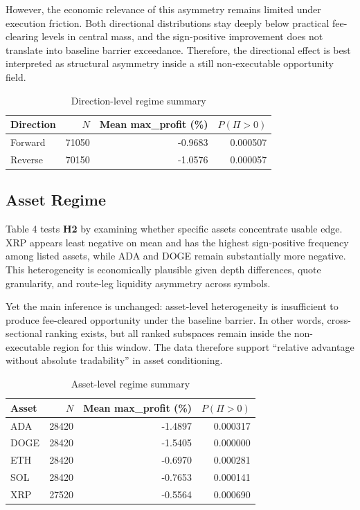 \documentclass[11pt,a4paper]{article}
\begin{document}
\noindent However, the economic relevance of this asymmetry remains limited under execution friction. Both directional distributions stay deeply below practical fee-clearing levels in central mass, and the sign-positive improvement does not translate into baseline barrier exceedance. Therefore, the directional effect is best interpreted as structural asymmetry inside a still non-executable opportunity field.

\begin{table}[H]
\centering
\caption{Direction-level regime summary}
\begin{tabular}{l r r r}
\toprule
Direction & $N$ & Mean max\_profit (\%) & $P(\Pi>0)$ \\
\midrule
Forward & 71050 & -0.9683 & 0.000507 \\
Reverse & 70150 & -1.0576 & 0.000057 \\
\bottomrule
\end{tabular}
\end{table}

\subsection{Asset Regime}
\noindent Table 4 tests \textbf{H2} by examining whether specific assets concentrate usable edge. XRP appears least negative on mean and has the highest sign-positive frequency among listed assets, while ADA and DOGE remain substantially more negative. This heterogeneity is economically plausible given depth differences, quote granularity, and route-leg liquidity asymmetry across symbols.

\noindent Yet the main inference is unchanged: asset-level heterogeneity is insufficient to produce fee-cleared opportunity under the baseline barrier. In other words, cross-sectional ranking exists, but all ranked subspaces remain inside the non-executable region for this window. The data therefore support ``relative advantage without absolute tradability'' in asset conditioning.

\begin{table}[H]
\centering
\caption{Asset-level regime summary}
\begin{tabular}{l r r r}
\toprule
Asset & $N$ & Mean max\_profit (\%) & $P(\Pi>0)$ \\
\midrule
ADA & 28420 & -1.4897 & 0.000317 \\
DOGE & 28420 & -1.5405 & 0.000000 \\
ETH & 28420 & -0.6970 & 0.000281 \\
SOL & 28420 & -0.7653 & 0.000141 \\
XRP & 27520 & -0.5564 & 0.000690 \\
\bottomrule
\end{tabular}
\end{table}
\end{document}
